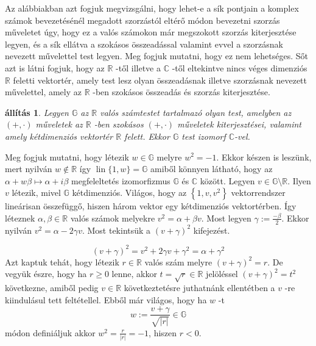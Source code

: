 \documentclass[9pt, showtrims]{memoir}
\makeatletter
\renewenvironment{proof}[1][\proofname]
    {\par\pushQED{\qed}%
    \normalfont \topsep6\p@\@plus6\p@\relax
    \trivlist
    \item[\hskip\labelsep
        \itshape
    #1\@addpunct{:}]\ignorespaces}
    {\popQED\endtrivlist\@endpefalse}
\theoremstyle{plain}
\newtheorem{proposition}{állítás}[section]
\theoremstyle{remark}
\theoremstyle{definition}
\makeatother
\begin{document}
Az alábbiakban azt fogjuk megvizsgálni, hogy lehet-e a sík pontjain
a komplex számok bevezetésénél megadott szorzástól eltérő
módon bevezetni szorzás műveletet úgy, hogy ez a valós számokon
már megszokott szorzás kiterjesztése legyen, és a sík ellátva
a szokásos összeadással valamint evvel a szorzásnak nevezett művelettel test legyen.
Meg fogjuk mutatni, hogy ez nem lehetséges.
Sőt
azt is látni fogjuk, hogy az $\mathbb{R}$ -től illetve a $\mathbb{C}$ -től
eltekintve nincs véges dimenziós $\mathbb{R}$ feletti vektortér, amely
test lesz olyan összeadásnak illetve szorzásnak nevezett művelettel, 
amely az $\mathbb{R}$ -ben szokásos összeadás és szorzás kiterjesztése.

\begin{proposition}
\label{Th:CUnique1}Legyen $\mathbb{G}$ az $\mathbb{R}$ valós számtestet
tartalmazó olyan test, amelyben az $\left( +,\cdot \right) $ műveletek az $\mathbb{R}$ -ben szokásos $\left( +,\cdot \right) $ műveletek kiterjesztései, valamint amely kétdimenziós vektortér $\mathbb{R}$ felett.
Ekkor $\mathbb{G}$ test izomorf $\mathbb{C}$-vel.
\end{proposition}

\begin{proof}
Meg fogjuk mutatni, hogy létezik $w\in \mathbb{G}$ melyre $w^{2}=-1$.
Ekkor
készen is leszünk, mert nyilván $w\notin \mathbb{R}$ így $\operatorname{lin}\{1,w\}=\mathbb{G}$ amiből könnyen látható, hogy
az $\alpha +w\beta \longmapsto \alpha +i\beta $ megfeleltetés
izomorfizmus $\mathbb{G}$ és $\mathbb{C}$ között.
\newline
Legyen $v\in \mathbb{G}\setminus \mathbb{R}$.
Ilyen $v$ létezik, mivel $\mathbb{G}
$ kétdimenziós.
Világos, hogy az $\left\{
1,v,v^{2}\right\} $ vektorrendszer lineárisan összefüggő,
hiszen három vektor egy kétdimenziós vektortérben.
\'{I}gy léteznek $\alpha ,\beta \in \mathbb{R}$ valós számok melyekre $v^{2}=\alpha +\beta v$.
Most legyen $\gamma :=\frac{-\beta }{2}
$.
Ekkor nyilván $v^{2}=\alpha -2\gamma v$.
Most tekintsük a $\left(
v+\gamma \right) ^{2}$ kifejezést.

\[
\left( v+\gamma \right) ^{2}=v^{2}+2\gamma v+\gamma ^{2}=\alpha +\gamma ^{2}
\]
Azt kaptuk tehát, hogy létezik $r\in \mathbb{R}$ valós szám
melyre $\left( v+\gamma \right) ^{2}=r$.
De vegyük észre, hogy ha $r\geq 0$ lenne, 
akkor $t=\sqrt{r}\in\mathbb{R}$
jelöléssel $\left( v+\gamma \right)^2=t^2$ következne, amiből pedig $v\in \mathbb{R}$ következtetésre juthatnánk ellentétben a $v$ -re kiindulásul tett feltétellel.
Ebből már
világos, hogy ha $w$ -t 
\[
w:=\frac{v+\gamma }{\sqrt{\left| r\right| }}\in \mathbb{G}
\]
módon definiáljuk akkor $w^{2}=\frac{r}{\left| r\right| }=-1$,
hiszen $r<0$.
\end{proof}
\end{document}
